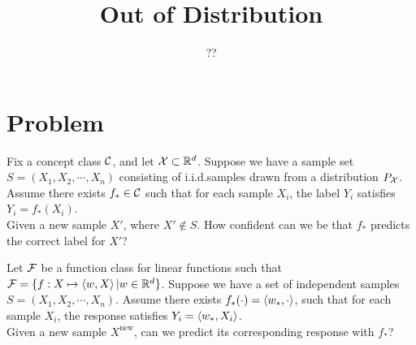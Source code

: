 \documentclass[11pt,fullpage]{article}
\begin{document}
\title{Out of Distribution}
\author{??}
\maketitle

\section{Problem}
Fix a concept class $ {\mathcal{C}} $,
and let ${\mathcal{X}}  \subset {{\mathbb{R}}}^d$. Suppose we have a sample set $S=(X_1, X_2,\cdots, X_n)$ consisting of i.i.d.samples drawn from a distribution $P_{{\mathcal{X}}}$. Assume there exists $f_*\in {\mathcal{C}}$ 
such that  for each sample $X_i$, the label $Y_i$ satisfies $ Y_i = f_*(X_i)$. \\
Given a new sample $X'$, where $X'\notin S$. How confident can we be that $f_*$ predicts the correct label for $X'$?

\begin{example}
Let ${\mathcal{F}}$ be a function class for linear functions such that ${\mathcal{F}} = \{f: X \mapsto  \left\langle w, X \right\rangle |  w\in {{\mathbb{R}}}^d\}$. Suppose we have a set of independent samples $S = (X_1, X_2, \cdots, X_n)$. Assume there exists $f_*(\cdot ) = \left\langle w_*, \cdot  \right\rangle$, such that for each sample $X_i$, the response satisfies $Y_i= \left\langle w_*, X_i \right\rangle$.\\
Given a new sample $X^{\text{new}}$, can we predict its corresponding response with $f_*$?
\end{example}

\begin{example}
    
\end{example}



\end{document}
